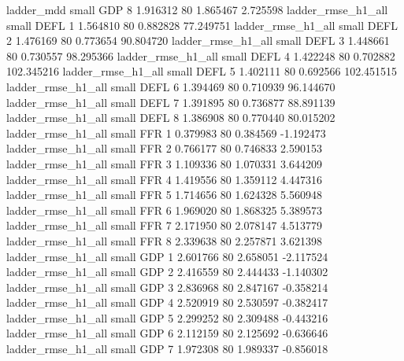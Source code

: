              ladder_mdd      small      GDP                 8 1.916312 80       1.865467           2.725598
      ladder_rmse_h1_all      small     DEFL                 1 1.564810 80       0.882828          77.249751
      ladder_rmse_h1_all      small     DEFL                 2 1.476169 80       0.773654          90.804720
      ladder_rmse_h1_all      small     DEFL                 3 1.448661 80       0.730557          98.295366
      ladder_rmse_h1_all      small     DEFL                 4 1.422248 80       0.702882         102.345216
      ladder_rmse_h1_all      small     DEFL                 5 1.402111 80       0.692566         102.451515
      ladder_rmse_h1_all      small     DEFL                 6 1.394469 80       0.710939          96.144670
      ladder_rmse_h1_all      small     DEFL                 7 1.391895 80       0.736877          88.891139
      ladder_rmse_h1_all      small     DEFL                 8 1.386908 80       0.770440          80.015202
      ladder_rmse_h1_all      small      FFR                 1 0.379983 80       0.384569          -1.192473
      ladder_rmse_h1_all      small      FFR                 2 0.766177 80       0.746833           2.590153
      ladder_rmse_h1_all      small      FFR                 3 1.109336 80       1.070331           3.644209
      ladder_rmse_h1_all      small      FFR                 4 1.419556 80       1.359112           4.447316
      ladder_rmse_h1_all      small      FFR                 5 1.714656 80       1.624328           5.560948
      ladder_rmse_h1_all      small      FFR                 6 1.969020 80       1.868325           5.389573
      ladder_rmse_h1_all      small      FFR                 7 2.171950 80       2.078147           4.513779
      ladder_rmse_h1_all      small      FFR                 8 2.339638 80       2.257871           3.621398
      ladder_rmse_h1_all      small      GDP                 1 2.601766 80       2.658051          -2.117524
      ladder_rmse_h1_all      small      GDP                 2 2.416559 80       2.444433          -1.140302
      ladder_rmse_h1_all      small      GDP                 3 2.836968 80       2.847167          -0.358214
      ladder_rmse_h1_all      small      GDP                 4 2.520919 80       2.530597          -0.382417
      ladder_rmse_h1_all      small      GDP                 5 2.299252 80       2.309488          -0.443216
      ladder_rmse_h1_all      small      GDP                 6 2.112159 80       2.125692          -0.636646
      ladder_rmse_h1_all      small      GDP                 7 1.972308 80       1.989337          -0.856018
